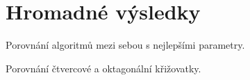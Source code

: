 




\section{Hromadné výsledky}\label{sec:hromadne_vysledky}

Porovnání algoritmů mezi sebou s nejlepšími parametry.

Porovnání čtvercové a oktagonální křižovatky.



